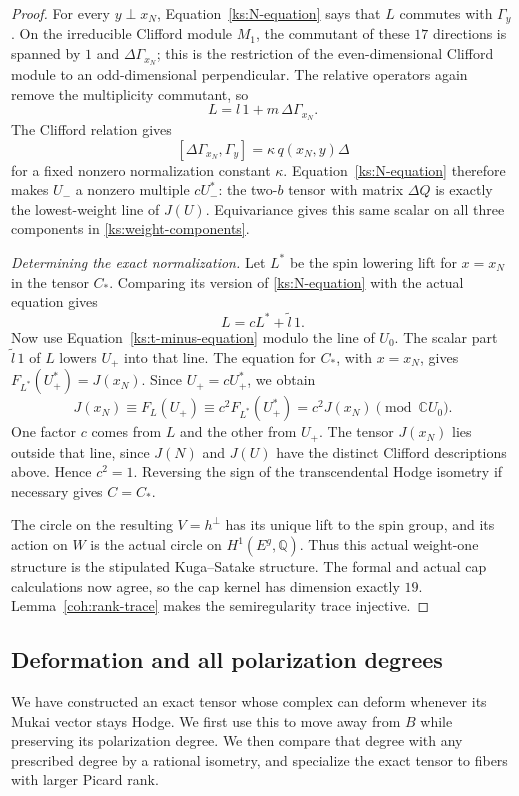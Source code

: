 \documentclass[11pt]{article}
\numberwithin{equation}{section}
\theoremstyle{definition}
\theoremstyle{remark}
\begin{document}
\begin{proof}
For every $y\perp x_N$, Equation~\eqref{ks:N-equation}
says that $L$ commutes with $\Gamma_y$.  On the irreducible
Clifford module $M_1$, the commutant of these $17$
directions is spanned by $1$ and $\Delta\Gamma_{x_N}$;
this is the restriction of the even-dimensional Clifford
module to an odd-dimensional perpendicular.  The relative
operators again remove the multiplicity commutant, so
\[
 L=l\,1+m\,\Delta\Gamma_{x_N}.
\]
The Clifford relation gives
\[
 [\Delta\Gamma_{x_N},\Gamma_y]
   =\kappa\,q(x_N,y)\Delta
\]
for a fixed nonzero normalization constant $\kappa$.
Equation~\eqref{ks:N-equation} therefore makes $U_-$ a
nonzero multiple $cU_-^*$: the two-$b$ tensor with matrix
$\Delta Q$ is exactly the lowest-weight line of $J(U)$.
Equivariance gives this same scalar on all three
components in \eqref{ks:weight-components}.

\emph{Determining the exact normalization.}
Let $L^*$ be the spin lowering lift for
$x=x_N$ in the tensor $C_*$.  Comparing its version of
\eqref{ks:N-equation} with the actual equation gives
\[
 L=cL^*+\widetilde l\,1.
\]
Now use Equation~\eqref{ks:t-minus-equation} modulo the line
of $U_0$.  The scalar part $\widetilde l\,1$ of $L$
lowers $U_+$ into that line.  The equation for $C_*$,
with $x=x_N$, gives $F_{L^*}(U_+^*)=J(x_N)$.
Since $U_+=cU_+^*$, we obtain
\[
 J(x_N)\equiv F_L(U_+)
   \equiv c^2 F_{L^*}(U_+^*)=c^2J(x_N)
       \pmod{\mathbb C U_0}.
\]
One factor $c$ comes from $L$ and the other from $U_+$.
The tensor
$J(x_N)$ lies outside that line, since $J(N)$ and $J(U)$
have the distinct Clifford descriptions above.  Hence
$c^2=1$.  Reversing the sign of the transcendental Hodge
isometry if necessary gives $C=C_*$.

The circle on the resulting $V=h^\perp$ has its unique
lift to the spin group, and its action on $W$ is the
actual circle on $H^1(E^g,\mathbb Q)$.  Thus this actual
weight-one structure is the stipulated Kuga--Satake
structure.  The formal and actual cap calculations now
agree, so the cap kernel has dimension exactly $19$.
Lemma~\ref{coh:rank-trace} makes the
semiregularity trace injective.
\end{proof}

\subsection{Deformation and all polarization degrees}
\label{ks:deformation}

We have constructed an exact tensor whose complex can deform
whenever its Mukai vector stays Hodge.  We first use this to
move away from $B$ while preserving its polarization degree.
We then compare that degree with any prescribed degree by a
rational isometry, and specialize the exact tensor to fibers
with larger Picard rank.
\end{document}
